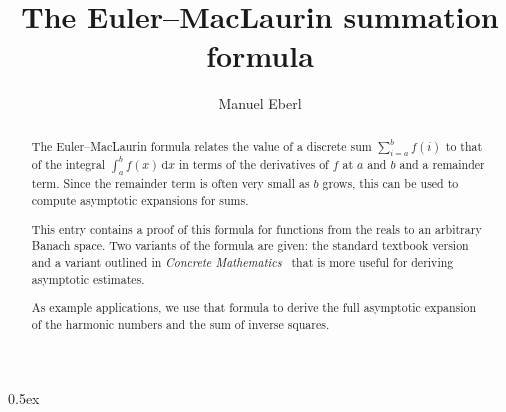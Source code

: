 \documentclass[11pt,a4paper]{article}
\begin{document}
\title{The Euler--MacLaurin summation formula}
\author{Manuel Eberl}
\maketitle

\begin{abstract}
The Euler--MacLaurin formula relates the value of a discrete sum 
$\sum_{i=a}^b f(i)$ to that of the integral $\int_a^b f(x)\,\text{d}x$ in 
terms of the derivatives of $f$ at $a$ and $b$ and a remainder term. Since the remainder term is often very small as $b$ grows, this can be used 
to compute asymptotic expansions for sums.
	
This entry contains a proof of this formula for functions from the reals to an arbitrary Banach space. Two variants of the formula are given: the standard textbook version and a variant outlined in \emph{Concrete Mathematics}~\cite{GKP_CM} that is more useful for deriving asymptotic estimates. 

As example applications, we use that formula to derive the full asymptotic expansion of the harmonic numbers and the sum of inverse squares.
\end{abstract}

\tableofcontents
\newpage
\parindent 0pt\parskip 0.5ex





\end{document}

